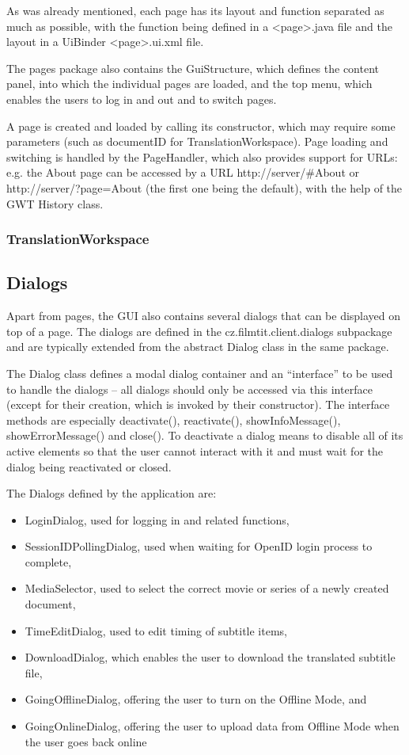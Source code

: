 As was already mentioned, each page has its layout and function separated as much as possible, with the function being defined in a <page>.java file and the layout in a UiBinder <page>.ui.xml file.

The pages package also contains the GuiStructure, which defines the content panel, into which the individual pages are loaded, and the top menu, which enables the users to log in and out and to switch pages.

A page is created and loaded by calling its constructor, which may require some parameters (such as documentID for TranslationWorkspace).
Page loading and switching is handled by the PageHandler, which also provides support for URLs: e.g. the About page can be accessed by a URL http://server/\#About or http://server/?page=About (the first one being the default), with the help of the GWT History class.

\subsubsection{TranslationWorkspace}


\subsection{Dialogs}

Apart from pages, the GUI also contains several dialogs that can be displayed on top of a page. The dialogs are defined in the cz.filmtit.client.dialogs subpackage and are typically extended from the abstract Dialog class in the same package.

The Dialog class defines a modal dialog container and an ``interface'' to be used to handle the dialogs -- all dialogs should only be accessed via this interface (except for their creation, which is invoked by their constructor).
The interface methods are especially
deactivate(), reactivate(), showInfoMessage(), showErrorMessage() and close(). To deactivate a dialog means to disable all of its active elements so that the user cannot interact with it and must wait for the dialog being reactivated or closed.

The Dialogs defined by the application are:
\begin{itemize}
\item LoginDialog, used for logging in and related functions,
\item SessionIDPollingDialog, used when waiting for OpenID login process to complete,
\item MediaSelector, used to select the correct movie or series of a newly created document,
\item TimeEditDialog, used to edit timing of subtitle items,
\item DownloadDialog, which enables the user to download the translated subtitle file,
\item GoingOfflineDialog, offering the user to turn on the Offline Mode, and
\item GoingOnlineDialog, offering the user to upload data from Offline Mode when the user goes back online
\end{itemize}

